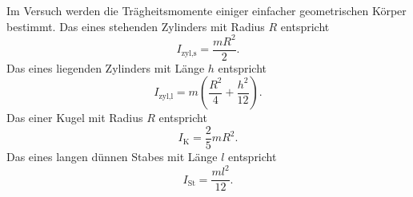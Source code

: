 Im Versuch werden die Trägheitsmomente einiger einfacher geometrischen Körper bestimmt.
Das eines stehenden Zylinders mit Radius $R$ entspricht
\begin{equation}
    I_\text{zyl,s} = \frac{m R^2}{2}.
    \label{eqn:zyls}
\end{equation}
Das eines liegenden Zylinders mit Länge $h$ entspricht
\begin{equation}
    I_\text{zyl,l} = m \left ( \frac{R^2}{4} + \frac{h^2}{12} \right ).
    \label{eqn:zyll}
\end{equation}
Das einer Kugel mit Radius $R$ entspricht
\begin{equation}
    I_\text{K} = \frac{2}{5}mR^2 .
    \label{eqn:kugel}
\end{equation}
Das eines langen dünnen Stabes mit Länge $l$ entspricht
\begin{equation}
    I_\text{St} = \frac{ml^2}{12} .
    \label{eqn:stab}
\end{equation}

